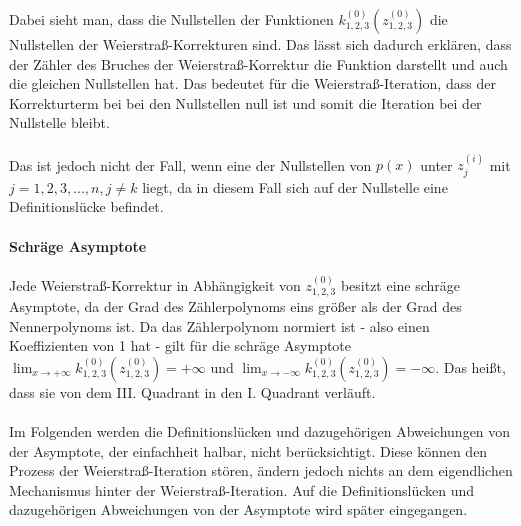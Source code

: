 \documentclass[12pt]{article}
\begin{document}
Dabei sieht man, dass die Nullstellen der Funktionen $k_{1,2,3}^{(0)}(z_{1,2,3}^{(0)})$ die Nullstellen der Weierstraß-Korrekturen sind. Das lässt sich dadurch erklären, dass der Zähler des Bruches der Weierstraß-Korrektur die Funktion darstellt und auch die gleichen Nullstellen hat. Das bedeutet für die Weierstraß-Iteration, dass der Korrekturterm bei bei den Nullstellen null ist und somit die Iteration bei der Nullstelle bleibt.\\\\
Das ist jedoch nicht der Fall, wenn eine der Nullstellen von $p(x)$ unter $z_j^{(i)}$ mit $j=1,2,3,...,n, j \neq k$ liegt, da in diesem Fall sich auf der Nullstelle eine Definitionslücke befindet.

\paragraph{Schräge Asymptote}
Jede Weierstraß-Korrektur in Abhängigkeit von $z_{1,2,3}^{(0)}$ besitzt eine schräge Asymptote, da der Grad des  Zählerpolynoms eins größer als der Grad des Nennerpolynoms ist. Da das Zählerpolynom normiert ist - also einen Koeffizienten von 1 hat - gilt für die schräge Asymptote $\lim_{x\rightarrow +\infty} k_{1,2,3}^{(0)}(z_{1,2,3}^{(0)}) = +\infty$ und $\lim_{x\rightarrow -\infty} k_{1,2,3}^{(0)}(z_{1,2,3}^{(0)}) = -\infty$. Das heißt, dass sie von dem III. Quadrant in den I. Quadrant verläuft.
\\\\
Im Folgenden werden die Definitionslücken und dazugehörigen Abweichungen von der Asymptote, der einfachheit halbar, nicht berücksichtigt. Diese können den Prozess der Weierstraß-Iteration stören, ändern jedoch nichts an dem eigendlichen Mechanismus hinter der Weierstraß-Iteration. Auf die Definitionslücken und dazugehörigen Abweichungen von der Asymptote wird später eingegangen.
\\\\
\end{document}
